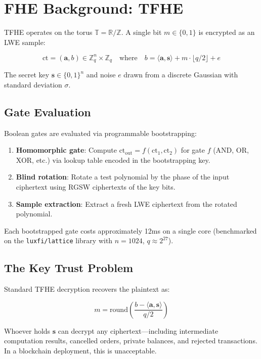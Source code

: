 \section{FHE Background: TFHE}


TFHE operates on the torus $\mathbb{T} = \mathbb{R}/\mathbb{Z}$. A single bit $m \in \{0,1\}$ is encrypted as an LWE sample:

$$\text{ct} = (\mathbf{a}, b) \in \mathbb{Z}_q^n \times \mathbb{Z}_q \quad \text{where} \quad b = \langle \mathbf{a}, \mathbf{s} \rangle + m \cdot \lfloor q/2 \rfloor + e$$

The secret key $\mathbf{s} \in \{0,1\}^n$ and noise $e$ drawn from a discrete Gaussian with standard deviation $\sigma$.

\subsection{Gate Evaluation}

Boolean gates are evaluated via programmable bootstrapping:

\begin{enumerate}[leftmargin=2em]
\item \textbf{Homomorphic gate}: Compute $\text{ct}_{\text{out}} = f(\text{ct}_1, \text{ct}_2)$ for gate $f$ (AND, OR, XOR, etc.) via lookup table encoded in the bootstrapping key.
\item \textbf{Blind rotation}: Rotate a test polynomial by the phase of the input ciphertext using RGSW ciphertexts of the key bits.
\item \textbf{Sample extraction}: Extract a fresh LWE ciphertext from the rotated polynomial.
\end{enumerate}

Each bootstrapped gate costs approximately 12ms on a single core (benchmarked on the \texttt{luxfi/lattice} library with $n=1024$, $q \approx 2^{27}$).

\subsection{The Key Trust Problem}

Standard TFHE decryption recovers the plaintext as:

$$m = \text{round}\left(\frac{b - \langle \mathbf{a}, \mathbf{s} \rangle}{q/2}\right)$$

Whoever holds $\mathbf{s}$ can decrypt any ciphertext---including intermediate computation results, cancelled orders, private balances, and rejected transactions. In a blockchain deployment, this is unacceptable.

